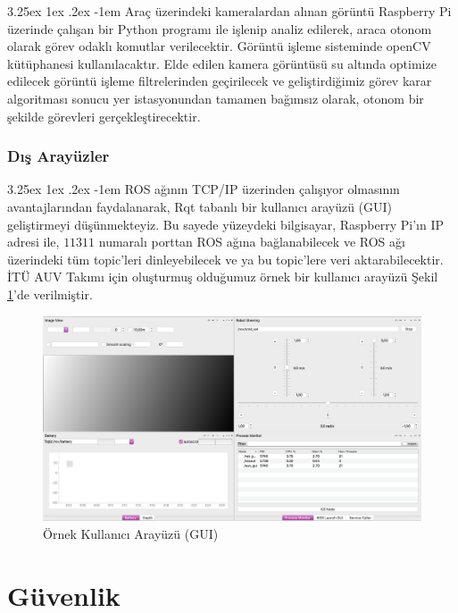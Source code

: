 \documentclass[12pt]{article}
\makeatletter
\newcounter{subsubsubsection}[subsubsection]
\renewcommand\paragraph{\@startsection{paragraph}{5}{\z@}%
  {3.25ex \@plus1ex \@minus.2ex}%
  {-1em}%
  {\normalfont\normalsize\bfseries}}
\makeatother
\begin{document}
\paragraph{} Araç üzerindeki kameralardan alınan görüntü Raspberry Pi üzerinde çalışan bir Python programı ile işlenip analiz edilerek, araca otonom olarak görev odaklı komutlar verilecektir. Görüntü işleme sisteminde openCV kütüphanesi kullanılacaktır. Elde edilen kamera görüntüsü su altında optimize edilecek görüntü işleme filtrelerinden\cite{ARTICLE:image_proc} geçirilecek ve geliştirdiğimiz görev karar algoritması sonucu yer istasyonundan tamamen bağımsız olarak, otonom bir şekilde görevleri gerçekleştirecektir.


\subsubsection{Dış Arayüzler}
\paragraph{} ROS ağının TCP/IP üzerinden çalışıyor olmasının avantajlarından faydalanarak, Rqt tabanlı bir kullanıcı arayüzü (GUI) geliştirmeyi düşünmekteyiz. Bu sayede yüzeydeki bilgisayar, Raspberry Pi'ın IP adresi ile, $11311$ numaralı porttan ROS ağına bağlanabilecek ve ROS ağı üzerindeki tüm topic'leri dinleyebilecek ve ya bu topic'lere veri aktarabilecektir. İTÜ AUV Takımı için oluşturmuş olduğumuz örnek bir kullanıcı arayüzü Şekil \ref{fig:gui}'de verilmiştir.
\newpage
\begin{figure}
\centering
\includegraphics[width=1\textwidth]{images/gui.png}
\caption{Örnek Kullanıcı Arayüzü (GUI)}
\label{fig:gui}
\end{figure}


\section{Güvenlik}
\end{document}
